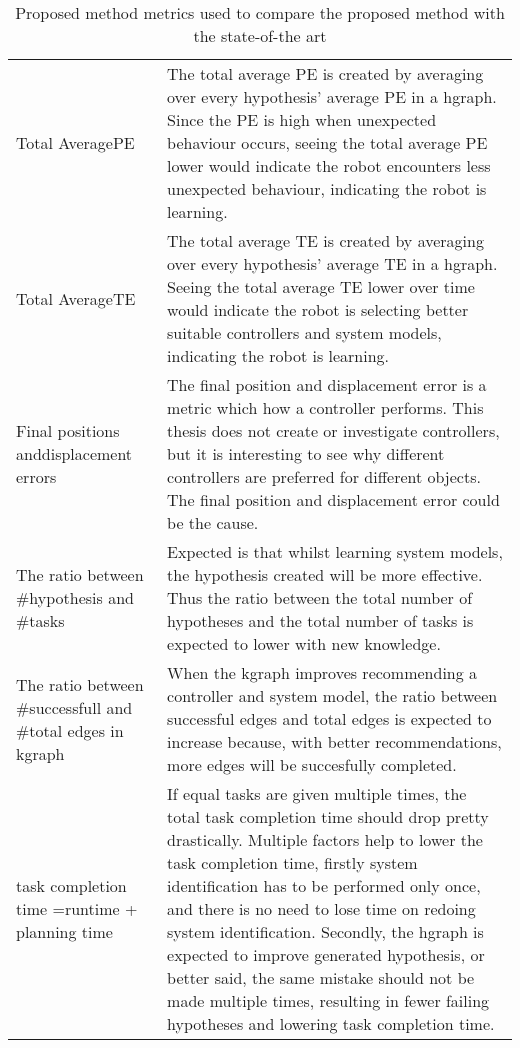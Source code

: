 \begin{table}[htb!]
\centering
\begin{tabular}[t]{p{4cm} p{10cm}}
Total Average\newline \acl{PE} & The total average \ac{PE} is created by averaging over every hypothesis' average \ac{PE} in a \ac{hgraph}. Since the \ac{PE} is high when unexpected behaviour occurs, seeing the total average \ac{PE} lower would indicate the robot encounters less unexpected behaviour, indicating the robot is learning.\\
Total Average\newline \acl{TE}& The total average \ac{TE} is created by averaging over every hypothesis' average \ac{TE} in a \ac{hgraph}. Seeing the total average \ac{TE} lower over time would indicate the robot is selecting better suitable controllers and system models, indicating the robot is learning.\\
Final positions and\newline displacement errors & The final position and displacement error is a metric which how a controller performs. This thesis does not create or investigate controllers, but it is interesting to see why different controllers are preferred for different objects. The final position and displacement error could be the cause.\\
The ratio between \#hypothesis and \#tasks & Expected is that whilst learning system models, the hypothesis created will be more effective. Thus the ratio between the total number of hypotheses and the total number of tasks is expected to lower with new knowledge.\\
The ratio between \#successfull and \#total edges in \ac{kgraph} & When the \ac{kgraph} improves recommending a controller and system model, the ratio between successful edges and total edges is expected to increase because, with better recommendations, more edges will be succesfully completed.\\
task completion time =\newline runtime + planning time& If equal tasks are given multiple times, the total task completion time should drop pretty drastically. Multiple factors help to lower the task completion time, firstly system identification has to be performed only once, and there is no need to lose time on redoing system identification. Secondly, the \ac{hgraph} is expected to improve generated hypothesis, or better said, the same mistake should not be made multiple times, resulting in fewer failing hypotheses and lowering task completion time.\\
\end{tabular}
\caption{Proposed method metrics used to compare the proposed method with the state-of-the art}\label{table:proposed_method_metrics}
\end{table}

